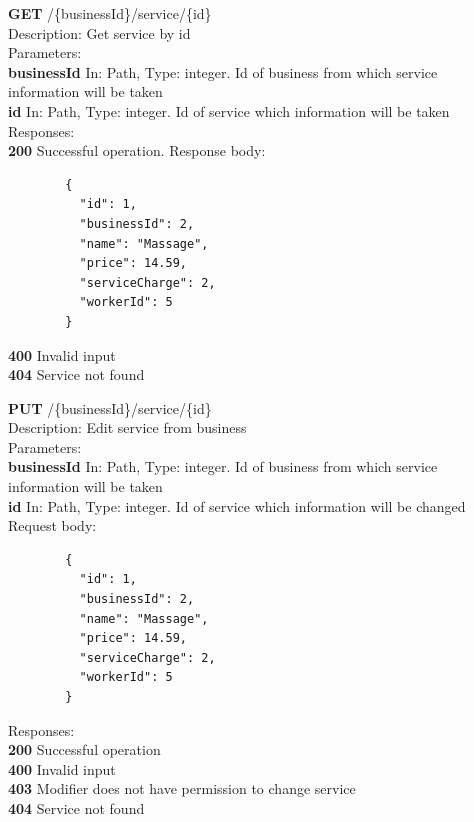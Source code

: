 \documentclass[11pt,a4paper,pdftex]{article}
\begin{document}
\hspace*{1em}\textbf{GET} /\{businessId\}/service/\{id\}\\
\hspace*{2em}Description: Get service by id\\
\hspace*{2em}Parameters:\\
\hspace*{3em}\textbf{businessId} In: Path, Type: integer. Id of business from which service information will be taken\\
\hspace*{3em}\textbf{id} In: Path, Type: integer. Id of service which information will be taken\\
\hspace*{2em}Responses:\\
\hspace*{3em}\textbf{200} Successful operation. Response body:
\begin{verbatim}
        {
          "id": 1,
          "businessId": 2,
          "name": "Massage",
          "price": 14.59,
          "serviceCharge": 2,
          "workerId": 5
        }
\end{verbatim}
\hspace*{3em}\textbf{400} Invalid input\\
\hspace*{3em}\textbf{404} Service not found

\hspace*{1em}\textbf{PUT} /\{businessId\}/service/\{id\}\\
\hspace*{2em}Description: Edit service from business\\
\hspace*{2em}Parameters:\\
\hspace*{3em}\textbf{businessId} In: Path, Type: integer. Id of business from which service information will be taken\\
\hspace*{3em}\textbf{id} In: Path, Type: integer. Id of service which information will be changed\\
\hspace*{2em}Request body:\\
\begin{verbatim}
        {
          "id": 1,
          "businessId": 2,
          "name": "Massage",
          "price": 14.59,
          "serviceCharge": 2,
          "workerId": 5
        }
\end{verbatim}
\hspace*{2em}Responses:\\
\hspace*{3em}\textbf{200} Successful operation\\
\hspace*{3em}\textbf{400} Invalid input\\
\hspace*{3em}\textbf{403} Modifier does not have permission to change service\\
\hspace*{3em}\textbf{404} Service not found
\end{document}
